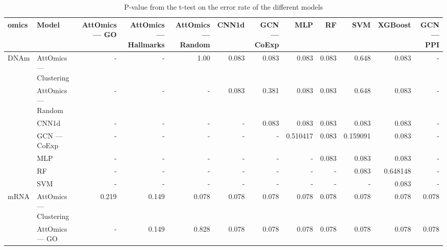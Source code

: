 \begin{sidewaystable}
	\centering
	\caption{P-value from the t-test on the error rate of the different models}\label{tab:pval_error_rate}
	\begin{tabular}{llrrrrrrrrrr}
		\toprule
		omics                  & Model                   & AttOmics --- GO & AttOmics --- Hallmarks & AttOmics --- Random & CNN1d & GCN --- CoExp & MLP      & RF    & SVM      & XGBoost  & GCN --- PPI \\
		\midrule
		\multirow{7}{*}{DNAm}  & AttOmics --- Clustering & -               & -                      & 1.00                & 0.083 & 0.083         & 0.083    & 0.083 & 0.648    & 0.083    & -           \\
		                       & AttOmics --- Random     & -               & -                      & -                   & 0.083 & 0.381         & 0.083    & 0.083 & 0.648    & 0.083    & -           \\
		                       & CNN1d                   & -               & -                      & -                   & -     & 0.083         & 0.083    & 0.083 & 0.083    & 0.083    & -           \\
		                       & GCN --- CoExp           & -               & -                      & -                   & -     & -             & 0.510417 & 0.083 & 0.159091 & 0.083    & -           \\
		                       & MLP                     & -               & -                      & -                   & -     & -             & -        & 0.083 & 0.083    & 0.083    & -           \\
		                       & RF                      & -               & -                      & -                   & -     & -             & -        & -     & 0.083    & 0.648148 & -           \\
		                       & SVM                     & -               & -                      & -                   & -     & -             & -        & -     & -        & 0.083    & -           \\
		\midrule
		\multirow{10}{*}{mRNA} & AttOmics --- Clustering & 0.219           & 0.149                  & 0.078               & 0.078 & 0.078         & 0.078    & 0.078 & 0.078    & 0.078    & 0.078       \\
		                       & AttOmics --- GO         & -               & 0.149                  & 0.828               & 0.078 & 0.078         & 0.078    & 0.078 & 0.078    & 0.078    & 0.078       \\

\end{tabular}
\end{sidewaystable}
